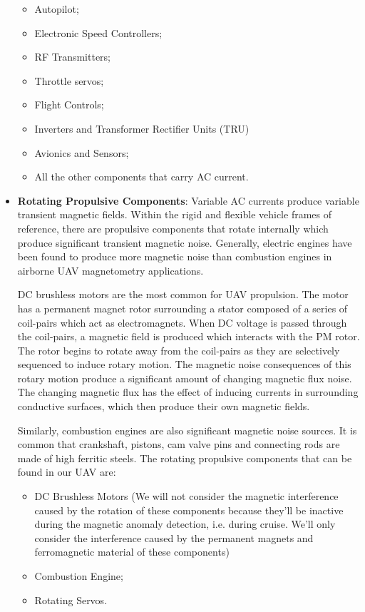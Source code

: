 \documentclass[english,fira]{ist-report}
\begin{document}
\begin{itemize}
    \begin{itemize}
        \item Autopilot;
        \item Electronic Speed Controllers;
        \item RF Transmitters;
        \item Throttle servos;
        \item Flight Controls;
        \item Inverters and Transformer Rectifier Units (TRU)
        \item Avionics and Sensors;
        \item All the other components that carry AC current.
    \end{itemize}
    \item \textbf{Rotating Propulsive Components}: Variable AC currents produce variable transient magnetic fields. Within the rigid and flexible vehicle frames of reference, there are propulsive components that rotate internally which produce significant transient magnetic noise. Generally, electric engines have been found to produce more magnetic noise than combustion engines in airborne UAV magnetometry applications. \par DC brushless motors are the most common for UAV propulsion. The motor has a permanent magnet rotor surrounding a stator composed of a series of coil-pairs which act as electromagnets. When DC voltage is passed through the coil-pairs, a magnetic field is produced which interacts with the PM rotor. The rotor begins to rotate away from the coil-pairs as they are selectively sequenced to induce rotary motion. The magnetic noise consequences of this rotary motion produce a significant amount of changing magnetic flux noise. The changing magnetic flux has the effect of inducing currents in surrounding conductive surfaces, which then produce their own magnetic fields.\par
    Similarly, combustion engines are also significant magnetic noise sources. It is common that crankshaft, pistons, cam valve pins and connecting rods are made of high ferritic steels. The rotating propulsive components that can be found in our UAV are:
    \begin{itemize}
        \item DC Brushless Motors (We will not consider the magnetic interference caused by the rotation of these components because they’ll be inactive during the magnetic anomaly detection, i.e. during cruise. We’ll only consider the interference caused by the permanent magnets and ferromagnetic material of these components)
        \item Combustion Engine;
        \item Rotating Servos.
    \end{itemize}
\end{itemize}
\end{document}
